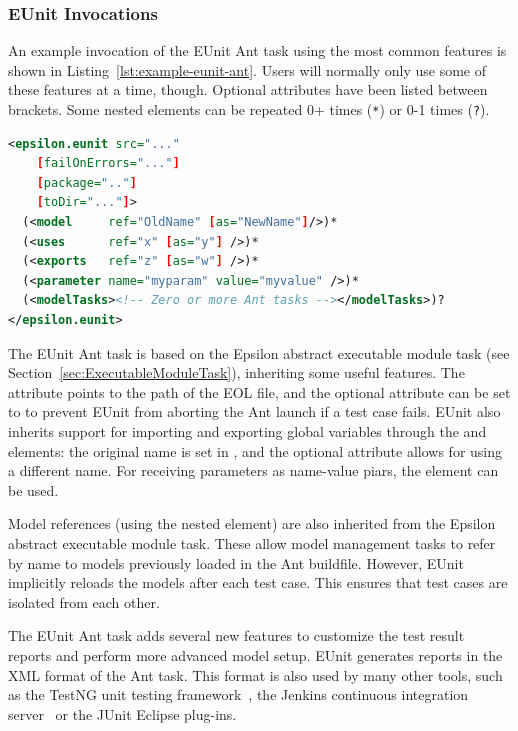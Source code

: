 \subsubsection{EUnit Invocations}

An example invocation of the EUnit Ant task using the most common features is shown in Listing~\ref{lst:example-eunit-ant}. Users will normally only use some of these features at a time, though. Optional attributes have been listed between brackets. Some nested elements can be repeated 0+ times (\verb!*!) or 0-1 times (\verb!?!).

\begin{lstlisting}[language=XML,columns=fixed,caption=Format of an invocation of the EUnit Ant task,label=lst:example-eunit-ant,float]
<epsilon.eunit src="..."
    [failOnErrors="..."]
    [package=".."]
    [toDir="..."]>
  (<model     ref="OldName" [as="NewName"]/>)*
  (<uses      ref="x" [as="y"] />)*
  (<exports   ref="z" [as="w"] />)*
  (<parameter name="myparam" value="myvalue" />)*
  (<modelTasks><!-- Zero or more Ant tasks --></modelTasks>)?
</epsilon.eunit>
\end{lstlisting}

The EUnit Ant task is based on the Epsilon abstract executable module task (see Section~\ref{sec:ExecutableModuleTask}), inheriting some useful features. The attribute  points to the path of the EOL file, and the optional attribute  can be set to  to prevent EUnit from aborting the Ant launch if a test case fails. EUnit also inherits support for importing and exporting global variables through the  and  elements: the original name is set in , and the optional  attribute allows for using a different name. For receiving parameters as name-value piars, the  element can be used.

Model references (using the  nested element) are also inherited from the Epsilon abstract executable module task. These allow model management tasks to refer by name to models previously loaded in the Ant buildfile. However, EUnit implicitly reloads the models after each test case. This ensures that test cases are isolated from each other.

The EUnit Ant task adds several new features to customize the test result reports and perform more advanced model setup. EUnit generates reports in the XML format of the Ant  task. This format is also used by many other tools, such as the TestNG unit testing framework~\cite{TestNG}, the Jenkins continuous integration server~\cite{Jenkins} or the JUnit Eclipse plug-ins.

